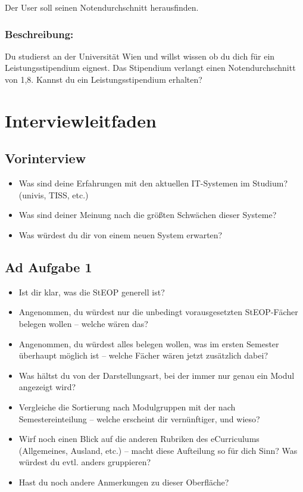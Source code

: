 \documentclass[a4paper,10pt]{scrartcl}
\begin{document}
Der User soll seinen Notendurchschnitt herausfinden.

\subsubsection*{Beschreibung:}

Du studierst an der Universität Wien und willst wissen ob du dich für ein Leistungsstipendium eignest. Das Stipendium verlangt einen Notendurchschnitt von
1,8. Kannst du ein Leistungsstipendium erhalten?


\section{Interviewleitfaden}

\subsection{Vorinterview}

\begin{itemize}
 \item Was sind deine Erfahrungen mit den aktuellen IT-Systemen im Studium? (univis, TISS, etc.)
 \item Was sind deiner Meinung nach die größten Schwächen dieser Systeme?
 \item Was würdest du dir von einem neuen System erwarten?
\end{itemize}

\subsection{Ad Aufgabe 1}

\begin{itemize}
 \item Ist dir klar, was die StEOP generell ist?
 \item Angenommen, du würdest nur die unbedingt vorausgesetzten StEOP-Fächer belegen wollen -- welche wären das?
 \item Angenommen, du würdest alles belegen wollen, was im ersten Semester überhaupt möglich ist -- welche Fächer wären jetzt zusätzlich dabei?
 \item Was hältst du von der Darstellungsart, bei der immer nur genau ein Modul angezeigt wird?
 \item Vergleiche die Sortierung nach Modulgruppen mit der nach Semestereinteilung -- welche erscheint dir vernünftiger, und wieso?
 \item Wirf noch einen Blick auf die anderen Rubriken des eCurriculums (Allgemeines, Ausland, etc.) -- macht diese Aufteilung so für dich Sinn? Was würdest du evtl. anders gruppieren?
 \item Hast du noch andere Anmerkungen zu dieser Oberfläche?
\end{itemize}
\end{document}
